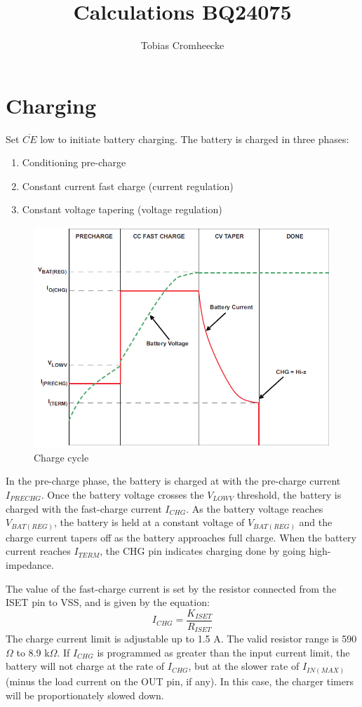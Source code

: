 \documentclass{article}
\title{Calculations BQ24075}
\author{Tobias Cromheecke}
\begin{document}
\maketitle

\section{Charging}
Set $\overline{CE}$ low to initiate battery charging. The battery is charged in three phases: 
\begin{enumerate}
\item Conditioning pre-charge
\item Constant current fast charge (current regulation) 
\item Constant voltage tapering (voltage regulation)
\end{enumerate}
\begin{figure}[!ht]
	\centering
	\includegraphics[width=1.0\linewidth]{Charge_cycle}
	\caption{Charge cycle}
	\label{fig:Charge _cycle}
\end{figure}
In the pre-charge phase, the battery is charged at with the pre-charge current $I_{PRECHG}$. Once the battery voltage crosses the $V_{LOWV}$ threshold, the battery is charged with the fast-charge current $I_{CHG}$. As the battery voltage reaches $V_{BAT(REG)}$, the battery is held at a constant voltage of $V_{BAT(REG)}$ and the charge current tapers off as the battery approaches full charge. When the battery current reaches $I_{TERM}$, the CHG pin indicates charging done by going high-impedance.

The value of the fast-charge current is set by the resistor connected from the ISET pin to VSS, and is given by the equation:
\[ I_{CHG} = \frac{K_{ISET}}{R_{ISET}} \]
The charge current limit is adjustable up to 1.5 A. The valid resistor range is 590 $\Omega$ to 8.9 k$\Omega$. If $I_{CHG}$ is programmed as greater than the input current limit, the battery will not charge at the rate of $I_{CHG}$, but at the slower rate of $I_{IN(MAX)}$ (minus the load current on the OUT pin, if any). In this case, the charger timers will be proportionately slowed down.
\end{document}
